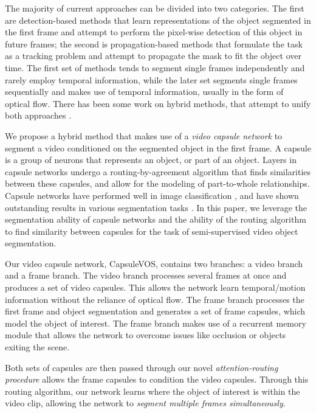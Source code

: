 \documentclass[10pt,twocolumn,letterpaper]{article}
\begin{document}
The majority of current approaches can be divided into two categories. The first are detection-based methods \cite{hu2018videomatch, chen2018blazingly, caelles2017one} that learn representations of the object segmented in the first frame and attempt to perform the pixel-wise detection of this object in future frames; the second is propagation-based methods \cite{ci2018video, hu2018motion, xiao2018monet} that formulate the task as a tracking problem and attempt to propagate the mask to fit the object over time. The first set of methods tends to segment single frames independently and rarely employ temporal information, while the later set segments single frames sequentially and makes use of temporal information, usually in the form of optical flow. There has been some work on hybrid methods, that attempt to unify both approaches \cite{wug2018fast, li2018video, yang2018efficient}.

We propose a hybrid method that makes use of a {\em video capsule network} to segment a video conditioned on the segmented object in the first frame. A capsule is a group of neurons that represents an object, or part of an object. Layers in capsule networks undergo a routing-by-agreement algorithm that finds similarities between these capsules, and allow for the modeling of part-to-whole relationships. Capsule networks have performed well in image classification \cite{sabour2017dynamic, hinton2018matrix}, and have shown outstanding results in various segmentation tasks \cite{lalonde2018capsules, duarte2018videocapsulenet}. In this paper, we leverage the segmentation ability of capsule networks and the ability of the routing algorithm to find similarity between capsules for the task of semi-supervised video object segmentation.

Our video capsule network, CapsuleVOS, contains two branches: a video branch and a frame branch. The video branch processes several frames at once and produces a set of video capsules. This allows the network learn temporal/motion information without the reliance of optical flow. The frame branch processes the first frame and object segmentation and generates a set of frame capsules, which model the object of interest. The frame branch makes use of a recurrent memory module that allows the network to overcome issues like occlusion or objects exiting the scene.

Both sets of capsules are then passed through our novel {\em attention-routing procedure} allows the frame capsules to condition the video capsules. Through this routing algorithm, our network learns where the object of interest is within the video clip, allowing the network to {\em segment multiple frames simultaneously}.
\end{document}
